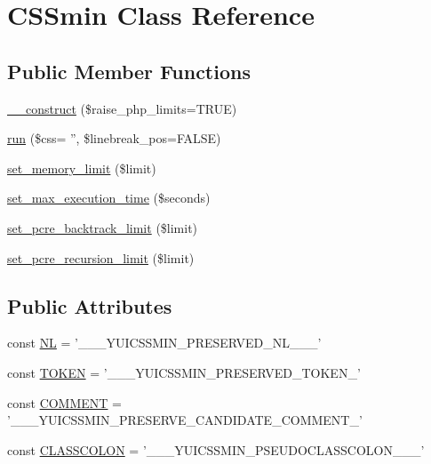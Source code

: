 \hypertarget{classCSSmin}{\section{C\+S\+Smin Class Reference}
\label{classCSSmin}
}
\subsection*{Public Member Functions}
\begin{DoxyCompactItemize}
\item 
\hyperlink{classCSSmin_a27eca8ae4ac475474ae10f3c6c8330d0}{\+\_\+\+\_\+construct} (\$raise\+\_\+php\+\_\+limits=T\+R\+U\+E)
\item 
\hyperlink{classCSSmin_a09dc031ef5d8618476147d4cf18a3e15}{run} (\$css= '', \$linebreak\+\_\+pos=F\+A\+L\+S\+E)
\item 
\hyperlink{classCSSmin_a5f497b0c5e32500e69260c58d575266c}{set\+\_\+memory\+\_\+limit} (\$limit)
\item 
\hyperlink{classCSSmin_add716d11ace7799312b347800fcaf9e6}{set\+\_\+max\+\_\+execution\+\_\+time} (\$seconds)
\item 
\hyperlink{classCSSmin_a996e3c26c694c6205b559bfcea08b84c}{set\+\_\+pcre\+\_\+backtrack\+\_\+limit} (\$limit)
\item 
\hyperlink{classCSSmin_a1ba64fb7c48d960e48e1abbf7e4ec1a6}{set\+\_\+pcre\+\_\+recursion\+\_\+limit} (\$limit)
\end{DoxyCompactItemize}
\subsection*{Public Attributes}
\begin{DoxyCompactItemize}
\item 
const \hyperlink{classCSSmin_a55e6cef0883c8562b768a871128a7e27}{N\+L} = '\+\_\+\+\_\+\+\_\+\+Y\+U\+I\+C\+S\+S\+M\+I\+N\+\_\+\+P\+R\+E\+S\+E\+R\+V\+E\+D\+\_\+\+N\+L\+\_\+\+\_\+\+\_\+'
\item 
const \hyperlink{classCSSmin_ae81aac5bd30611278b0f975aa38a7e50}{T\+O\+K\+E\+N} = '\+\_\+\+\_\+\+\_\+\+Y\+U\+I\+C\+S\+S\+M\+I\+N\+\_\+\+P\+R\+E\+S\+E\+R\+V\+E\+D\+\_\+\+T\+O\+K\+E\+N\+\_\+'
\item 
const \hyperlink{classCSSmin_a782919951e4ef91e7d76271c64ad8cfa}{C\+O\+M\+M\+E\+N\+T} = '\+\_\+\+\_\+\+\_\+\+Y\+U\+I\+C\+S\+S\+M\+I\+N\+\_\+\+P\+R\+E\+S\+E\+R\+V\+E\+\_\+\+C\+A\+N\+D\+I\+D\+A\+T\+E\+\_\+\+C\+O\+M\+M\+E\+N\+T\+\_\+'
\item 
const \hyperlink{classCSSmin_ade6afaef6380b7be294c2deeaf8588a0}{C\+L\+A\+S\+S\+C\+O\+L\+O\+N} = '\+\_\+\+\_\+\+\_\+\+Y\+U\+I\+C\+S\+S\+M\+I\+N\+\_\+\+P\+S\+E\+U\+D\+O\+C\+L\+A\+S\+S\+C\+O\+L\+O\+N\+\_\+\+\_\+\+\_\+'
\end{DoxyCompactItemize}


